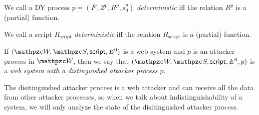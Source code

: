 \begin{theorem}
  \begin{definition}
    We call a DY process $p = (I^p,Z^p,R^p,s_0^p)$ \emph{deterministic} iff 
    the relation $R^p$ is a (partial) function.
  
    We call a script $R_\text{script}$ \emph{deterministic} iff the relation 
    $R_\text{script}$ is a (partial) function.
  \end{definition}

  \begin{definition}
    If $(\websystem, \scriptset,\mathsf{script}, E^0)$ is
    a web system and $p$ is an attacker process in
    $\websystem$, then we say that $(\websystem,
    \scriptset,\mathsf{script}, E^0,p)$ is a \emph{web
    system with a distinguished attacker process $p$}. 
  \end{definition}

  The disitinguished attacker process is a web attacker and 
  can receive all the data from other attacker processes, 
  so when we talk about indistinguishability of a system, 
  we will only analyze the state of the disitinguished attacker process.
  

\end{theorem}
